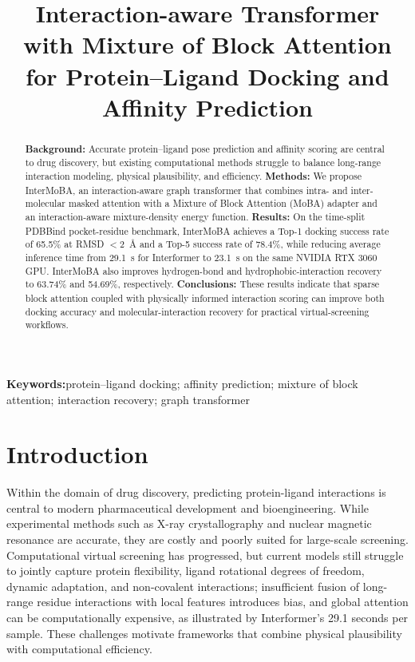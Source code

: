 \documentclass[11pt,a4paper]{article}
\title{Interaction-aware Transformer with Mixture of Block Attention for Protein--Ligand Docking and Affinity Prediction}
\date{}
\begin{document}
\maketitle
\thispagestyle{fancy}

\begin{abstract}
\textbf{Background:} Accurate protein--ligand pose prediction and affinity scoring are central to drug discovery, but existing computational methods struggle to balance long-range interaction modeling, physical plausibility, and efficiency. \textbf{Methods:} We propose InterMoBA, an interaction-aware graph transformer that combines intra- and inter-molecular masked attention with a Mixture of Block Attention (MoBA) adapter and an interaction-aware mixture-density energy function. \textbf{Results:} On the time-split PDBBind pocket-residue benchmark, InterMoBA achieves a Top-1 docking success rate of 65.5\% at RMSD $<2$~\AA{} and a Top-5 success rate of 78.4\%, while reducing average inference time from 29.1~s for Interformer to 23.1~s on the same NVIDIA RTX 3060 GPU. InterMoBA also improves hydrogen-bond and hydrophobic-interaction recovery to 63.74\% and 54.69\%, respectively. \textbf{Conclusions:} These results indicate that sparse block attention coupled with physically informed interaction scoring can improve both docking accuracy and molecular-interaction recovery for practical virtual-screening workflows.
\end{abstract}

\noindent\textbf{Keywords:}\enspace protein--ligand docking; affinity prediction; mixture of block attention; interaction recovery; graph transformer
\section{Introduction}
Within the domain of drug discovery, predicting protein-ligand interactions is central to modern pharmaceutical development\cite{wang2000calculating} and bioengineering. While experimental methods such as X-ray crystallography\cite{ladd1977structure} and nuclear magnetic resonance\cite{wuthrich1990protein} are accurate, they are costly and poorly suited for large-scale screening. Computational virtual screening\cite{dhakal2022artificial} has progressed, but current models still struggle to jointly capture protein flexibility, ligand rotational degrees of freedom\cite{lakowicz1983rotational}, dynamic adaptation, and non-covalent interactions\cite{hobza2010non}; insufficient fusion of long-range residue interactions\cite{tsuboyama2023mega} with local features introduces bias, and global attention can be computationally expensive, as illustrated by Interformer's 29.1 seconds per sample\cite{lai2024interformer}. These challenges motivate frameworks that combine physical plausibility\cite{morris2021using} with computational efficiency\cite{lu2025moba}.
\end{document}
